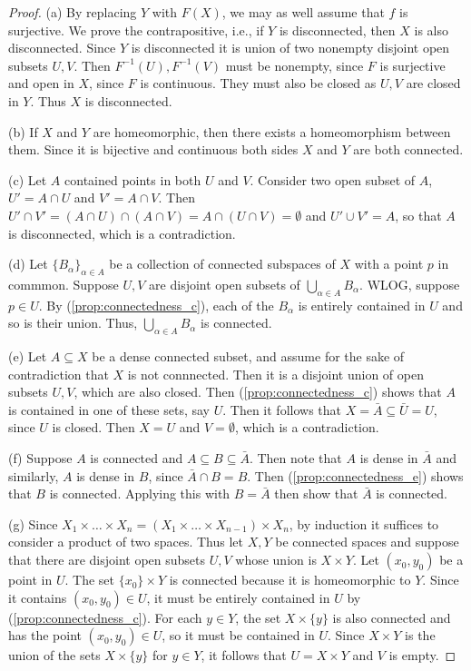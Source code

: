 \documentclass[11pt,a4paper]{article}
\begin{document}
\begin{proof}
\noindent (a) By replacing $Y$ with $F(X)$, we may as well assume that $f$ is surjective. We prove the contrapositive, i.e., if $Y$ is disconnected, then $X$ is also disconnected. Since $Y$ is disconnected it is union of two nonempty disjoint open subsets $U, V$. Then $F^{-1}(U), F^{-1}(V)$ must be nonempty, since $F$ is surjective and open in $X$, since $F$ is continuous. They must also be closed as $U, V$ are closed in $Y$. Thus $X$ is disconnected.

\noindent (b) If $X$ and $Y$ are homeomorphic, then there exists a homeomorphism between them. Since it is bijective and continuous both sides $X$ and $Y$ are both connected.

\noindent (c) Let $A$ contained points in both $U$ and $V$. Consider two open subset of $A$, $U' = A\cap U$ and $V' = A\cap V$. Then $U'\cap V' = (A\cap U)\cap (A\cap V) = A\cap(U\cap V) = \emptyset$ and $U'\cup V' = A$, so that $A$ is disconnected, which is a contradiction.

\noindent (d) Let $\{B_\alpha\}_{\alpha\in A}$ be a collection of connected subspaces of $X$ with a point $p$ in commmon. Suppose $U, V$ are disjoint open subsets of $\bigcup_{\alpha\in A}B_\alpha$. WLOG, suppose $p\in U$. By (\ref{prop:connectedness_c}), each of the $B_\alpha$ is entirely contained in $U$ and so is their union. Thus, $\bigcup_{\alpha\in A}B_\alpha$ is connected.

\noindent (e) Let $A\subseteq X$ be a dense connected subset, and assume for the sake of contradiction that $X$ is not connnected. Then it is a disjoint union of open subsets $U,V$, which are also closed. Then (\ref{prop:connectedness_c}) shows that $A$ is contained in one of these sets, say $U$. Then it follows that $X = \bar{A}\subseteq \bar{U} = U$, since $U$ is closed. Then $X = U$ and $V=\emptyset$, which is a contradiction. 

\noindent (f) Suppose $A$ is connected and $A\subseteq B\subseteq \bar{A}$. Then note that $A$ is dense in $\bar{A}$ and similarly, $A$ is dense in $B$, since $\bar{A}\cap B = B$. Then (\ref{prop:connectedness_e}) shows that $B$ is connected. Applying this with $B = \bar{A}$ then show that $\bar{A}$ is connected.

\noindent (g) Since $X_1\times\ldots\times X_n = (X_1\times\ldots\times X_{n-1})\times X_n$, by induction it suffices to consider a product of two spaces. Thus let $X,Y$ be connected spaces and suppose that there are disjoint open subsets $U,V$ whose union is $X\times Y$. Let $(x_0,y_0)$ be a point in $U$. 
The set $\{x_0\}\times Y$ is connected because it is homeomorphic to $Y$. Since it contains $(x_0,y_0)\in U$, it must be entirely contained in $U$ by (\ref{prop:connectedness_c}). For each $y\in Y$, the set $X\times \{y\}$ is also connected and has the point $(x_0,y_0)\in U$, so it must be contained in $U$. Since $X\times Y$ is the union of the sets $X\times \{y\}$ for $y\in Y$, it follows that $U = X\times Y$ and $V$ is empty.


\end{proof}
\end{document}
